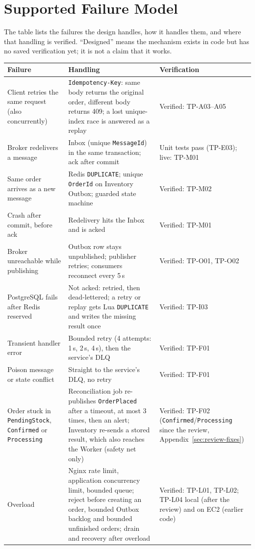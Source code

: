 \documentclass[a4paper]{report}
\begin{document}
\section{Supported Failure Model}
\label{sec:failure-model}
The table lists the failures the design handles, how it handles them, and
where that handling is verified. ``Designed'' means the mechanism exists in
code but has no saved verification yet; it is not a claim that it works.

\begin{center}
\small{}
\begin{tabular}{@{}>{\raggedright\arraybackslash}p{3.5cm}>{\raggedright\arraybackslash}p{7.7cm}>{\raggedright\arraybackslash}p{3.9cm}@{}}
\toprule
Failure & Handling & Verification \\
\midrule
Client retries the same request (also concurrently) & \texttt{Idempotency-Key}: same body returns the original order, different body returns 409; a lost unique-index race is answered as a replay & Verified: TP-A03--A05 \\
Broker redelivers a message & Inbox (unique \texttt{MessageId}) in the same transaction; ack after commit & Unit tests pass (TP-E03); live: TP-M01 \\
Same order arrives as a new message & Redis \texttt{DUPLICATE}; unique \texttt{OrderId} on Inventory Outbox; guarded state machine & Verified: TP-M02 \\
Crash after commit, before ack & Redelivery hits the Inbox and is acked & Verified: TP-M01 \\
Broker unreachable while publishing & Outbox row stays unpublished; publisher retries; consumers reconnect every 5\,s & Verified: TP-O01, TP-O02 \\
PostgreSQL fails after Redis reserved & Not acked: retried, then dead-lettered; a retry or replay gets Lua \texttt{DUPLICATE} and writes the missing result once & Verified: TP-I03 \\
Transient handler error & Bounded retry (4 attempts: 1\,s, 2\,s, 4\,s), then the service's DLQ & Verified: TP-F01 \\
Poison message or state conflict & Straight to the service's DLQ, no retry & Verified: TP-F01 \\
Order stuck in \texttt{PendingStock}, \texttt{Confirmed} or \texttt{Processing} & Reconciliation job re-publishes \texttt{OrderPlaced} after a timeout, at most 3 times, then an alert; Inventory re-sends a stored result, which also reaches the Worker (safety net only) & Verified: TP-F02 (\texttt{Confirmed}/\allowbreak\texttt{Processing} since the review, Appendix~\ref{sec:review-fixes}) \\
Overload & Nginx rate limit, application concurrency limit, bounded queue; reject before creating an order, bounded Outbox backlog and bounded unfinished orders; drain and recovery after overload & Verified: TP-L01, TP-L02; TP-L04 local (after the review) and on EC2 (earlier code) \\
\bottomrule
\end{tabular}
\end{center}
\end{document}
